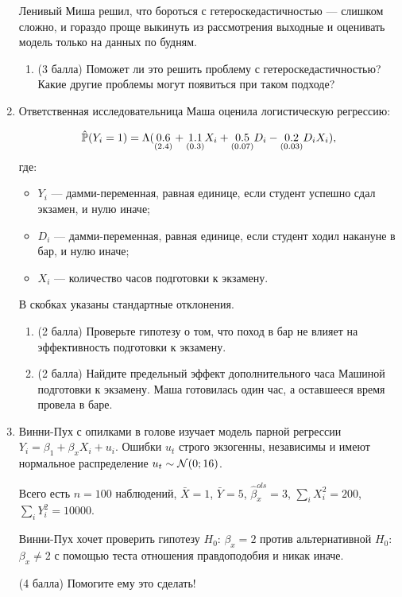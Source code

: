 \begin{enumerate}
\begin{enumerate}
\end{enumerate}

Ленивый Миша решил, что бороться с гетероскедастичностью — слишком сложно, и гораздо проще выкинуть из рассмотрения выходные и оценивать модель только на данных по будням. 

\begin{enumerate}[resume]
\item (3 балла) Поможет ли это решить проблему с гетероскедастичностью? Какие другие проблемы могут появиться при таком подходе?



\end{enumerate}



\item 
Ответственная исследовательница Маша оценила логистическую регрессию:

\[
\hat \P(Y_i = 1) = \Lambda( \underset{(2.4)}{0.6} + \underset{(0.3)}{1.1} X_i + \underset{(0.07)}{0.5} D_i - \underset{(0.03)}{0.2} D_i X_i),
\]
где:
\begin{itemize}
\item $Y_i$ — дамми-переменная, равная единице, если студент успешно сдал экзамен, и нулю иначе; 
\item $D_i$ — дамми-переменная, равная единице, если студент ходил накануне в бар, и нулю иначе;
\item $X_i$ — количество часов подготовки к экзамену. 
\end{itemize}

В скобках указаны стандартные отклонения.

\begin{enumerate} 

\item (2 балла) Проверьте гипотезу о том, что поход в бар не влияет на эффективность подготовки к экзамену.

\item (2 балла) Найдите предельный эффект дополнительного часа Машиной подготовки к экзамену. 
Маша готовилась один час, а оставшееся время провела в баре.

\end{enumerate}


\item 
Винни-Пух с опилками в голове изучает модель парной регрессии $Y_i = \beta_1 + \beta_x X_i + u_i$.
Ошибки $u_t$ строго экзогенны, независимы и имеют нормальное распределение $u_t \sim \cN(0;16)$.

Всего есть $n=100$ наблюдений, $\bar X = 1$, $\bar Y= 5$, $\hat \beta_x^{ols} = 3$, $\sum_i X_i^2=200$, $\sum_i Y_i^2=10000$.


Винни-Пух хочет проверить гипотезу $H_0$: $\beta_x = 2$ против альтернативной $H_0$: $\beta_x \neq 2$ с помощью теста отношения правдоподобия и никак иначе. 


(4 балла) Помогите ему это сделать!


\end{enumerate}




